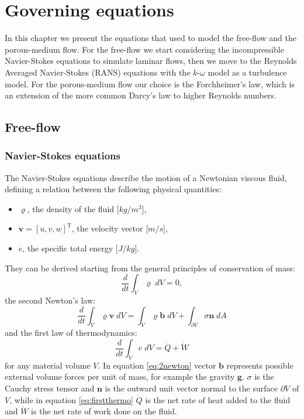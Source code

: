 \chapter{Governing equations} \label{chap:equations} %
In this chapter we present the equations that used to model the 
free-flow and the porous-medium flow. For the free-flow we start 
considering the incompressible Navier-Stokes equations to simulate laminar 
flows, then we move to the Reynolds Averaged Navier-Stokes (RANS) equations with the $k\text{-}\omega$ 
model as a turbulence model. For the porous-medium 
flow our choice is the Forchheimer's law, which is an extension of the more 
common Darcy's law to higher Reynolds numbers.
\section{Free-flow}
\subsection{Navier-Stokes equations}
The Navier-Stokes equations describe the motion of a Newtonian viscous fluid,
defining a relation between the following physical quantities:
\begin{itemize}
	\item $\varrho$, the density of the fluid  [$\si{kg/m^3}$],
	\item $\mathbf{v} = [u, v, w]^\mathrm{T}$, the velocity vector [$\si{m/s}$],
	\item $e$, the specific total energy [$\si{J/kg}$].
\end{itemize}
They can be derived starting from the general principles of conservation of 
mass:
\begin{equation} \label{eq:masscons}
\frac{d}{dt} \int_V \varrho \; dV = 0,
\end{equation}
the second Newton's law:
\begin{equation} \label{eq:2newton}
\frac{d}{dt} \int_V \varrho \mathbf{v} \; dV = \int_V \varrho \mathbf{b} \; dV 
+ 
\int_{\partial V} \sigma \mathbf{n} \; dA
\end{equation}
and the first law of thermodynamics:
\begin{equation} \label{eq:firstthermo}
\frac{d}{dt} \int_V e \; dV = \dot{Q} + \dot{W}
\end{equation}
for any material volume $V$. In equation \eqref{eq:2newton} vector 
$\mathbf{b}$ represents possible external volume forces per unit of mass, for 
example the gravity $\mathbf{g}$. $\sigma$ is the Cauchy stress tensor 
and 
$\mathbf{n}$ is the outward unit vector normal to the surface $\partial V$ of 
$V$, while in equation \eqref{eq:firstthermo} $\dot{Q}$ is the net rate of 
heat added to the fluid and $\dot{W}$ is the net rate of work done on the fluid.

